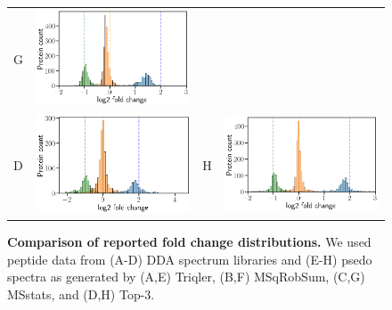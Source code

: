 \documentclass[11pt]{article}
\begin{document}
\begin{figure}[hbt]
\begin{tabular}{lclc}
        G & \includegraphics[width=0.4\linewidth]{../../result/report_plots/diann_msstats_intensity.png} \\ 
        D & \includegraphics[width=0.4\linewidth]{../../result/report_plots/osw_top3_intensity.png} &
        H & \includegraphics[width=0.4\linewidth]{../../result/report_plots/diann_top3_intensity.png} 
    \end{tabular}
   
    \caption{{\bf Comparison of reported fold change distributions.} We used peptide data from (A-D) DDA spectrum libraries and (E-H) psedo spectra as generated by 
    (A,E) Triqler, (B,F) MSqRobSum, (C,G) MSstats, and (D,H) Top-3. \label{fig:fc_histogram_again}}
\end{figure}

\fi
\end{document}
